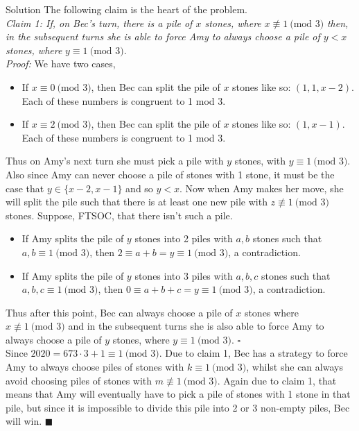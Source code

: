 \documentclass{article}
\begin{document}
\begin{solution}{Solution}
The following claim is the heart of the problem. \\

\textit{Claim 1: If, on Bec's turn, there is a pile of
$x$ stones, where} $x \nequiv 1 \ \text{(mod } 3)$
\textit{then, in the subsequent turns she is able to force Amy to
always choose a pile of $y < x$ stones, where} $y \equiv 1 \ \text{(mod } 3
)$. \\

\textit{Proof:} We have two cases,

\begin{itemize}
\item If $x \equiv 0 \ \text{(mod } 3)$, then Bec can split the pile of
$x$ stones like so: $(1, 1, x-2)$. Each of these numbers is congruent to 1
mod 3.
\item If $x \equiv 2  \ \text{(mod } 3)$, then Bec can split the pile of
$x$ stones like so: $(1, x-1)$. Each of these numbers is congruent to 1 mod
3.
\end{itemize}

Thus on Amy's next turn she must pick a pile with $y$ stones, with
$y \equiv 1 \ \text{(mod } 3)$. Also since Amy can never choose a pile of
stones with 1 stone, it must be the case that $y \in \{ x-2, x-1 \}$
and so $y < x$.
Now when Amy makes her move,
she will split the pile such that there is at least one new pile with
$z \nequiv 1 \ \text{(mod } 3)$ stones. Suppose, FTSOC, that there isn't
such a pile.

\begin{itemize}
\item If Amy splits the pile of $y$ stones into 2 piles with $a,b$ stones
such that $a,b \equiv 1 \ \text{(mod } 3)$, then $2 \equiv a+b = y
\equiv 1 \ \text{(mod } 3)$, a contradiction.
\item If Amy splits the pile of $y$ stones into 3 piles with $a,b,c$ stones
such that $a,b,c \equiv 1 \ \text{(mod } 3)$, then $0 \equiv a+b+c = y
\equiv 1 \ \text{(mod } 3)$, a contradiction.
\end{itemize}

Thus after this point, Bec can always choose a pile of $x$ stones where
$x \nequiv 1 \ \text{(mod } 3)$ and in the subsequent turns she is also
able to force Amy to always choose a pile of $y$ stones,
where $y \equiv 1 \ \text{(mod } 3)$.
$\square$ \\

Since $2020 = 673 \cdot 3 + 1 \equiv 1 \ \text{(mod } 3)$. Due to claim 1,
Bec has a strategy to force Amy to always choose piles of stones with
$k \equiv 1 \ \text{(mod } 3)$, whilst she can always avoid choosing piles
of stones with $m \nequiv 1 \ \text{(mod } 3)$.
Again due to claim 1, that means that Amy will eventually
have to pick a pile of stones with 1 stone in that pile, but since it is
impossible to divide this pile into 2 or 3 non-empty piles, Bec will win.
$\blacksquare$
\end{solution}
\end{document}
